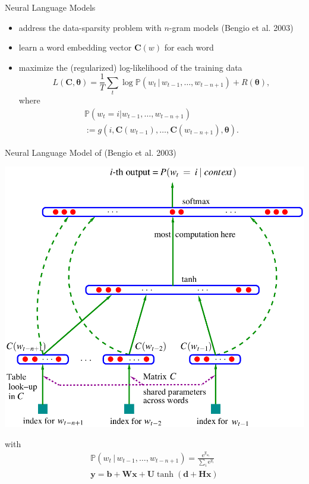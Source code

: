 \documentclass[xcolor=x11names,compress,ignorenonframetext,10pt]{beamer}
\renewcommand{\(}{\begin{columns}}
\renewcommand{\)}{\end{columns}}
\newcommand{\<}[1]{\begin{column}{#1}}
\renewcommand{\>}{\end{column}}
\def\refcolor{DodgerBlue4}
\newcommand{\refer}[1]{({\color{\refcolor}#1})}
\begin{document}
\begin{frame}{Neural Language Models}
\begin{itemize}
  \item address the data-sparsity problem with $n$-gram models \refer{Bengio et al. 2003}
  \item learn a word embedding vector $\mathbf{C}(w)$ for each word
  \item maximize the (regularized) log-likelihood of the training data
\[
L(\mathbf{C}, \bm{\theta}) = \frac{1}{T} \sum_t \log \mathbb{P}(w_t\,|\, w_{t-1}, \ldots, w_{t-n+1}) + R(\bm{\theta}),
\]
where 
\begin{multline*}
\mathbb{P}(w_t = i | w_{t-1}, \ldots, w_{t-n+1}) \\
 := g(i, \mathbf{C}(w_{t-1}), \ldots, \mathbf{C}(w_{t-n+1}), \bm{\theta}).
\end{multline*}

\end{itemize}
\end{frame}

\begin{frame}{Neural Language Model of \refer{Bengio et al. 2003}}
\begin{center}
\includegraphics[width=.5\textwidth]{figures/word2vec/bengio-model}
\end{center}

with 
\begin{gather*}
\mathbb{P}(w_t \, |\, w_{t-1}, \ldots, w_{t-n+1}) = \frac{\mathrm{e}^{y_{w_t}}}{\sum_i \mathrm{e}^{y_i}} \\
\mathbf{y} = \mathbf{b} + \mathbf{W}\mathbf{x} + \mathbf{U} \tanh(\mathbf{d} + \mathbf{H}\mathbf{x})
\end{gather*}
\end{frame}
\end{document}
